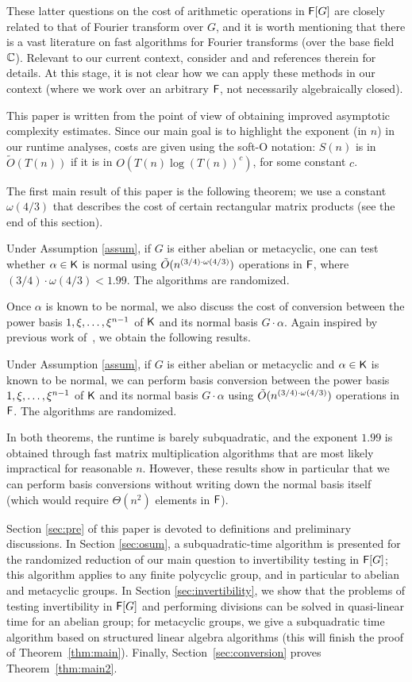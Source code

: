 These latter questions on the cost of arithmetic operations in ${\mathsf{F}}[G]$
are closely related to that of Fourier transform over $G$, and it is
worth mentioning that there is a vast literature on fast algorithms
for Fourier transforms (over the base field $\mathbb{C}$). Relevant to our
current context, consider \citep{ClaMu04} and \citep{MaRockWol18} and
references therein for details. At this stage, it is not clear how we
can apply these methods in our context (where we work over an
arbitrary ${\mathsf{F}}$, not necessarily algebraically closed).

This paper is written from the point of view of obtaining improved
asymptotic complexity estimates. Since our main goal is to highlight
the exponent (in $n$) in our runtime analyses, costs are given using
the soft-O notation: $S(n)$ is in $\tilde{O}(T(n))$ if it is in
$O(T(n) \log(T(n))^c)$, for some constant $c$.

The first main result of this paper is the following theorem; we use a
constant $\omega(4/3)$ that describes the cost of certain rectangular
matrix products (see the end of this section).
\begin{theorem}\label{thm:main}
  Under Assumption \ref{assum}, if $G$ is either abelian or
  metacyclic, one can test whether $\alpha \in {\mathsf{K}}$ is normal using
  $\tilde{O}(n^{(3/4)\cdot \omega(4/3)})$ operations in ${\mathsf{F}}$, where
  $(3/4)\cdot\omega(4/3)<1.99$. The algorithms are randomized.
\end{theorem}
Once $\alpha$ is known to be normal, we also discuss the cost 
of conversion between the power basis $1,\xi,\dots,\xi^{n-1}$
of ${\mathsf{K}}$ and its normal basis $G\cdot \alpha$. Again inspired by
previous work of~\cite{KalSho98}, we obtain the following results.
\begin{theorem}\label{thm:main2}
  Under Assumption \ref{assum}, if $G$ is either abelian or metacyclic
  and $\alpha \in {\mathsf{K}}$ is known to be normal, we can perform basis
  conversion between the power basis $1,\xi,\dots,\xi^{n-1}$ of
  ${\mathsf{K}}$ and its normal basis $G\cdot \alpha$ using $\tilde{O}(n^{(3/4)\cdot \omega(4/3)})$
  operations in ${\mathsf{F}}$. The algorithms are randomized.
\end{theorem}
In both theorems, the runtime is barely subquadratic, and the exponent
$1.99$ is obtained through fast matrix multiplication algorithms that
are most likely impractical for reasonable $n$. However, these results
show in particular that we can perform basis conversions without
writing down the normal basis itself (which would require
$\Theta(n^2)$ elements in ${\mathsf{F}}$).

Section \ref{sec:pre} of this paper is devoted to definitions and
preliminary discussions.  In Section \ref{sec:osum}, a
subquadratic-time algorithm is presented for the randomized reduction
of our main question to invertibility testing in ${\mathsf{F}}[G]$; this
algorithm applies to any finite polycyclic group, and in particular to
abelian and metacyclic groups. In Section \ref{sec:invertibility}, we
show that the problems of testing invertibility in ${\mathsf{F}}[G]$ and
performing divisions can be solved in quasi-linear time for an abelian
group; for metacyclic groups, we give a subquadratic time algorithm
based on structured linear algebra algorithms (this will finish the
proof of Theorem~\ref{thm:main}). Finally,
Section~\ref{sec:conversion} proves Theorem~\ref{thm:main2}.

